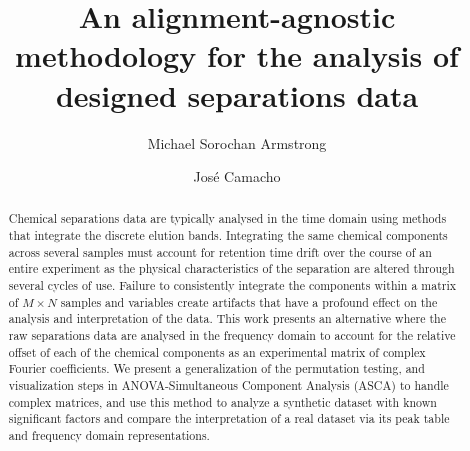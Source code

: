 \documentclass[preprint,12pt]{elsarticle}
\begin{document}
\begin{frontmatter}



\title{An alignment-agnostic methodology for the analysis of designed separations data}


\author{Michael Sorochan Armstrong}
\author{Jos\'e Camacho}
\address{Computational Data Science (CoDaS) Lab, Department of Signal Theory, Networks and Communication - University of Granada,%
            C/ Periodista Daniel Saucedo Aranda, 
            Granada,
            18071, 
            Andalusia,
            Spain}
\begin{abstract}
Chemical separations data are typically analysed in the time domain using methods that integrate the discrete elution bands. Integrating the same chemical components across several samples must account for retention time drift over the course of an entire experiment as the physical characteristics of the separation are altered through several cycles of use. Failure to consistently integrate the components within a matrix of $M \times N$ samples and variables create artifacts that have a profound effect on the analysis and interpretation of the data. This work presents an alternative where the raw separations data are analysed in the frequency domain to account for the relative offset of each of the chemical components as an experimental matrix of complex Fourier coefficients. We present a generalization of the permutation testing, and visualization steps in ANOVA-Simultaneous Component Analysis (ASCA) to handle complex matrices, and use this method to analyze a synthetic dataset with known significant factors and compare the interpretation of a real dataset via its peak table and frequency domain representations.


\end{abstract}
\end{frontmatter}
\end{document}
